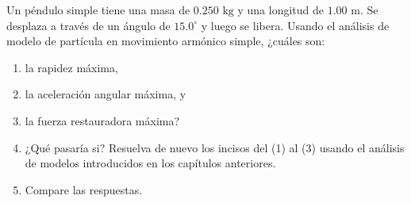 \item Un péndulo simple tiene una masa de $0.250\text{ kg}$ y una longitud de $1.00\text{ m}$. Se desplaza a través de un ángulo de $15.0^\circ$ y luego se libera. Usando el análisis de modelo de partícula en movimiento armónico simple, ¿cuáles son:
\begin{enumerate}
    \item la rapidez máxima,
    \item la aceleración angular máxima, y
    \item la fuerza restauradora máxima?
    \item ¿Qué pasaría si? Resuelva de nuevo los incisos del (1) al (3) usando el análisis de modelos introducidos en los capítulos anteriores.
    \item Compare las respuestas.
\end{enumerate}